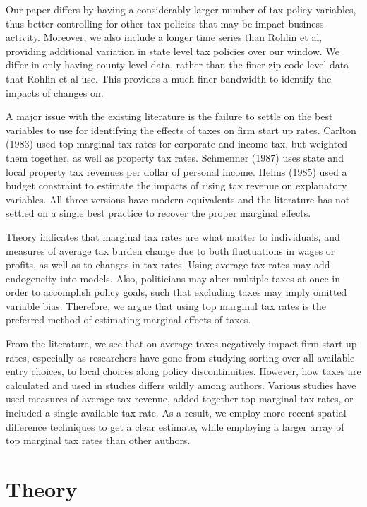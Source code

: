 \documentclass[12pt,a4paper]{article}
\begin{document}
Our paper differs by having a considerably larger number of tax policy variables, thus better controlling for other tax policies that may be impact business activity. Moreover, we also include a longer time series than Rohlin et al, providing additional variation in state level tax policies over our window. We differ in only having county level data, rather than the finer zip code level data that Rohlin et al use. This provides a much finer bandwidth to identify the impacts of changes on.

A major issue with the existing literature is the failure to settle on the best variables to use for identifying the effects of taxes on firm start up rates. Carlton (1983) used top marginal tax rates for corporate and income tax, but weighted them together, as well as property tax rates. Schmenner (1987) uses state and local property tax revenues per dollar of personal income. Helms (1985) used a budget constraint to estimate the impacts of rising tax revenue on explanatory variables. All three versions have modern equivalents and the literature has not settled on a single best practice to recover the proper marginal effects.

Theory indicates that marginal tax rates are what matter to individuals, and measures of average tax burden change due to both fluctuations in wages or profits, as well as to changes in tax rates. Using average tax rates may add endogeneity into models. Also, politicians may alter multiple taxes at once in order to accomplish policy goals, such that excluding taxes may imply omitted variable bias. Therefore, we argue that using top marginal tax rates is the preferred method of estimating marginal effects of taxes. 

From the literature, we see that on average taxes negatively impact firm start up rates, especially as researchers have gone from studying sorting over all available entry choices, to local choices along policy discontinuities. However, how taxes are calculated and used in studies differs wildly among authors. Various studies have used measures of average tax revenue, added together top marginal tax rates, or included a single available tax rate. As a result, we employ more recent spatial difference techniques to get a clear estimate, while employing a larger array of top marginal tax rates than other authors.
\section{Theory}
\end{document}
